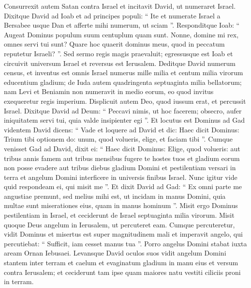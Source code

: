 \begin{biblechapter}
\begin{biblechapter}
\begin{biblechapter}
\begin{biblechapter}
\begin{biblechapter}
\begin{biblechapter}
\begin{biblechapter}
\begin{biblechapter}
\begin{biblechapter}
\begin{biblechapter}
\begin{biblechapter}
\begin{biblechapter}
\begin{biblechapter}
\begin{biblechapter}
\begin{biblechapter}
\begin{biblechapter}
\begin{biblechapter}
\begin{biblechapter}
\begin{biblechapter}
\begin{biblechapter}
\begin{biblechapter}
\verse Consurrexit autem Satan contra Israel et incitavit David, ut numeraret Israel. 
\verse Dixitque David ad Ioab et ad principes populi: “ Ite et numerate Israel a Bersabee usque Dan et afferte mihi numerum, ut sciam ”. 
\verse Responditque Ioab: “ Augeat Dominus populum suum centuplum quam sunt. Nonne, domine mi rex, omnes servi tui sunt? Quare hoc quaerit dominus meus, quod in peccatum reputetur Israeli? ”. 
\verse Sed sermo regis magis praevaluit; egressusque est Ioab et circuivit universum Israel et reversus est Ierusalem.
 \verse Deditque David numerum census, et inventus est omnis Israel numerus mille milia et centum milia virorum educentium gladium; de Iuda autem quadringenta septuaginta milia bellatorum; 
\verse nam Levi et Beniamin non numeravit in medio eorum, eo quod invitus exequeretur regis imperium. 
\verse Displicuit autem Deo, quod iussum erat, et percussit Israel.
 \verse Dixitque David ad Deum: “ Peccavi nimis, ut hoc facerem; obsecro, aufer iniquitatem servi tui, quia valde insipienter egi ”. 
\verse Et locutus est Dominus ad Gad videntem David dicens: 
\verse “ Vade et loquere ad David et dic: Haec dicit Dominus: Trium tibi optionem do: unum, quod volueris, elige, et faciam tibi ”. 
\verse Cumque venisset Gad ad David, dixit ei: “ Haec dicit Dominus: Elige, quod volueris: 
\verse aut tribus annis famem aut tribus mensibus fugere te hostes tuos et gladium eorum non posse evadere aut tribus diebus gladium Domini et pestilentiam versari in terra et angelum Domini interficere in universis finibus Israel. Nunc igitur vide quid respondeam ei, qui misit me ”.
 \verse Et dixit David ad Gad: “ Ex omni parte me angustiae premunt, sed melius mihi est, ut incidam in manus Domini, quia multae sunt miserationes eius, quam in manus hominum ”.
 \verse Misit ergo Dominus pestilentiam in Israel, et ceciderunt de Israel septuaginta milia virorum. 
\verse Misit quoque Deus angelum in Ierusalem, ut percuteret eam. Cumque percuteretur, vidit Dominus et misertus est super magnitudinem mali et imperavit angelo, qui percutiebat: “ Sufficit, iam cesset manus tua ”.
 Porro angelus Domini stabat iuxta aream Ornan Iebusaei. 
\verse Levansque David oculos suos vidit angelum Domini stantem inter terram et caelum et evaginatum gladium in manu eius et versum contra Ierusalem; et ceciderunt tam ipse quam maiores natu vestiti ciliciis proni in terram. 

\end{biblechapter}
\end{biblechapter}
\end{biblechapter}
\end{biblechapter}
\end{biblechapter}
\end{biblechapter}
\end{biblechapter}
\end{biblechapter}
\end{biblechapter}
\end{biblechapter}
\end{biblechapter}
\end{biblechapter}
\end{biblechapter}
\end{biblechapter}
\end{biblechapter}
\end{biblechapter}
\end{biblechapter}
\end{biblechapter}
\end{biblechapter}
\end{biblechapter}
\end{biblechapter}
